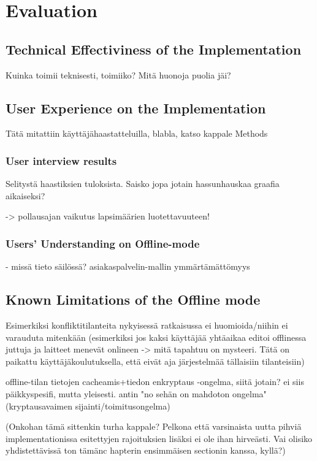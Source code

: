 \chapter{Evaluation}


\section{Technical Effectiviness of the Implementation}


Kuinka toimii teknisesti, toimiiko? Mitä huonoja puolia jäi?



\section{User Experience on the Implementation}
Tätä mitattiin käyttäjähaastatteluilla, blabla, katso kappale Methods

\subsection{User interview results}
Selitystä haastiksien tuloksista. Saisko jopa jotain hassunhauskaa graafia aikaiseksi?

-> pollausajan vaikutus lapsimäärien luotettavuuteen!


\subsection{Users' Understanding on Offline-mode}
- missä tieto säilössä? asiakaspalvelin-mallin ymmärtämättömyys





\section{Known Limitations of the Offline mode}
Esimerkiksi konfliktitilanteita nykyisessä ratkaisussa ei huomioida/niihin ei varauduta mitenkään (esimerkiksi jos kaksi käyttäjää yhtäaikaa editoi offlinessa juttuja ja laitteet menevät onlineen -> mitä tapahtuu on mysteeri. Tätä on paikattu käyttäjäkoulutuksella, että eivät aja järjestelmää tällaisiin tilanteisiin)

offline-tilan tietojen cacheamis+tiedon enkryptaus -ongelma, siitä jotain? ei siis päikkyspesifi, mutta yleisesti. antin "no sehän on mahdoton ongelma" (kryptausavaimen sijainti/toimitusongelma)

(Onkohan tämä sittenkin turha kappale? Pelkona että varsinaista uutta pihviä implementationissa esitettyjen rajoituksien lisäksi ei ole ihan hirveästi. Vai olisiko yhdistettävissä ton tämänc hapterin ensimmäisen sectionin kanssa, kyllä?)


